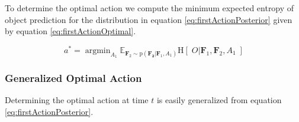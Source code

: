 \documentclass[conference]{IEEEtran}
\newcommand{\prob}[1]{\text{p}(#1)} %
\newcommand{\set}[1]{\mathbf{#1}} %
\DeclareMathOperator*{\argmin}{argmin}
\newcommand{\entropy}[1]{\text{H}\left[\;#1 \; \right]} %
\newcommand{\expectedValue}[2]{\hollow{E}_{#2}#1} %
\newcommand{\hollow}[1]{\mathbb{#1}} %
\begin{document}
        To determine the optimal action we compute the minimum expected entropy of object prediction for the distribution in equation \ref{eq:firstActionPosterior} given by equation \ref{eq:firstActionOptimal}.

        \begin{equation}
          \label{eq:firstActionOptimal}
          a^* = \argmin_{A_1} \expectedValue{\entropy{O|\set{F}_1,\set{F}_2,A_1}}{\set{F}_2 \sim \prob{\set{F_2}|\set{F}_1,A_1}}
        \end{equation}

    \subsubsection{Generalized Optimal Action}
        Determining the optimal action at time $t$ is easily generalized from equation \ref{eq:firstActionPosterior}.









\end{document}
